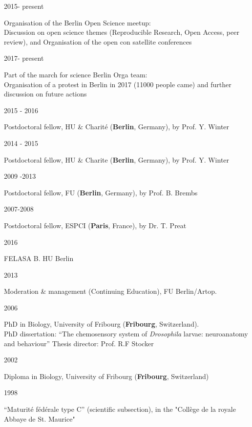   
 \parbox{0.15\textwidth}{2015- present}\hfill
\parbox[t]{0.83\textwidth}{Organisation of the Berlin Open Science meetup:\\
Discussion on open science themes (Reproducible Research, Open Access, peer review),
and Organisation of the open con satellite conferences}     
%
 \parbox{0.15\textwidth}{2017- present}\hfill
\parbox[t]{0.83\textwidth}{Part of the march for science Berlin Orga team:\\
Organisation of a protest in Berlin in 2017 (11000 people came) and further discussion on future actions}   
%
\parbox{0.15\textwidth}{2015 - 2016}\hfill
\parbox[t]{0.83\textwidth}{Postdoctoral fellow,
       HU \& Charit\'e (\textbf{Berlin}, Germany),
        by Prof. Y. Winter%
        }
\parbox{0.15\textwidth}{2014 - 2015}\hfill
\parbox[t]{0.83\textwidth}{Postdoctoral fellow,
       HU \& Charite (\textbf{Berlin}, Germany),
        by Prof. Y. Winter%
        }
%
%
\parbox{0.15\textwidth}{2009 -2013}\hfill
\parbox[t]{0.83\textwidth}{Postdoctoral fellow,
       FU (\textbf{Berlin}, Germany),
        by Prof. B. Brembs%
        }
                \parbox{0.15\textwidth}{2007-2008}\hfill
\parbox[t]{0.83\textwidth}{Postdoctoral fellow,
       ESPCI (\textbf{Paris}, France), by Dr. T. Preat%
        }
   \newpage     
{}
\parbox{0.15\textwidth}{2016}\hfill
\parbox[t]{0.83\textwidth}{FELASA B. HU Berlin
        }
\parbox{0.15\textwidth}{2013}\hfill
\parbox[t]{0.83\textwidth}{Moderation \& management (Continuing Education), FU Berlin/Artop.
        }
\parbox{0.15\textwidth}{2006}\hfill
\parbox[t]{0.83\textwidth}{PhD in Biology,
        University of Fribourg (\textbf{Fribourg}, Switzerland).\\
        PhD dissertation: ``The chemosensory system of \textit{Drosophila} larvae: neuroanatomy and behaviour''
        Thesis director: Prof. R.F Stocker}
\parbox{0.15\textwidth}{2002}\hfill
\parbox[t]{0.83\textwidth}{Diploma in Biology,
        University of Fribourg (\textbf{Fribourg}, Switzerland)
        }
\parbox{0.15\textwidth}{1998}\hfill
\parbox[t]{0.83\textwidth}{``Maturit\'e f\'ed\'erale type C'' (scientific subsection),
in the "Coll\`ege de la royale Abbaye de St. Maurice"}

